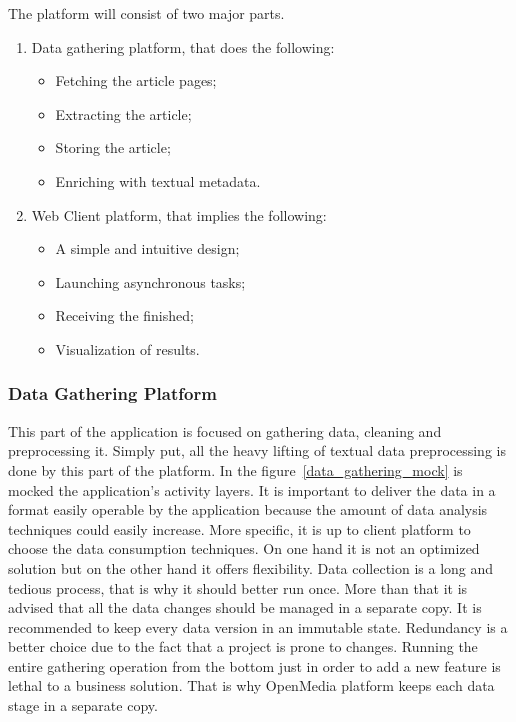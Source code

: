 The platform will consist of two major parts.
\begin{enumerate}
    \item Data gathering platform, that does the following:
    \begin{itemize}
        \item Fetching the article pages;
        \item Extracting the article;
        \item Storing the article;
        \item Enriching with textual metadata.
    \end{itemize}
    \item Web Client platform, that implies the following:
    \begin{itemize}
        \item A simple and intuitive design;
        \item Launching asynchronous tasks;
        \item Receiving the finished;
        \item Visualization of results.
    \end{itemize}
\end{enumerate}

\subsubsection{Data Gathering Platform}
This part of the application is focused on gathering data, cleaning and preprocessing it. Simply put, all the heavy lifting of textual data preprocessing is done by this part of the platform. In the \mbox{figure \ref{data_gathering_mock}} is mocked the application's activity layers. It is important to deliver the data in a format easily operable by the application because the amount of data analysis techniques could easily increase. More specific, it is up to client platform to choose the data consumption techniques. On one hand it is not an optimized solution but on the other hand it offers flexibility. Data collection is a long and tedious process, that is why it should better run once. More than that it is advised that all the data changes should be managed in a separate copy. It is recommended to keep every data version in an immutable state. Redundancy is a better choice due to the fact that a project is prone to changes. Running the entire gathering operation from the bottom just in order to add a new feature is lethal to a business solution. That is why OpenMedia platform keeps each data stage in a separate copy.

